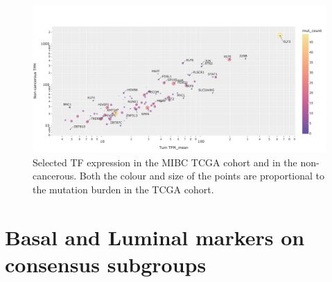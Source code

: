 \begin{figure}[!htb]
    \centering
    \includegraphics[width=1.0\textwidth,keepaspectratio]{Sections/Network_I/Resources/selective_pruning/sel_tfs/sel_tfs_mean_tum_healthy.png}
    \caption[Tumour vs non-tumour gene expression of the 98 TF]{Selected TF expression in the MIBC TCGA cohort and in the non-cancerous. Both the colour and size of the points are proportional to the mutation burden in the TCGA cohort.}
    \label{fig:ap:sel_tfs_mean}
\end{figure}


\section{Basal and Luminal markers on consensus subgroups} \label{s:ap:sel_prun_markers}

